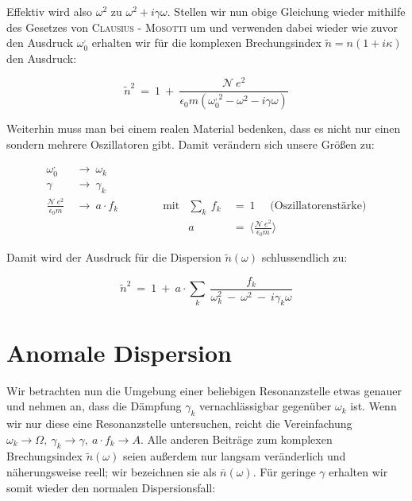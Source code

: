 Effektiv wird  also $\omega^2$ zu $\omega^2 + i\gamma\omega$. Stellen wir nun obige Gleichung wieder mithilfe des Gesetzes von \textsc{Clausius - Mosotti} um und verwenden dabei wieder wie zuvor den Ausdruck $\omega^{,}_0$ erhalten wir für die komplexen Brechungsindex $\tilde{n}= n (1+i\kappa)$ den Ausdruck:

\begin{equation*}
\tilde{n}^2 \ = \ 1 \ + \ \frac{\mathcal{N} \ e^2}{\epsilon_0 m \left(\omega^{,2}_0 - \omega^2 - i \gamma\omega\right)}
\end{equation*}

Weiterhin muss man bei einem realen Material bedenken, dass es nicht nur einen sondern mehrere Oszillatoren gibt. Damit verändern sich unsere Größen zu:

\begin{align*}
\omega^{,}_0 \ &\rightarrow \ \omega_k\\
\gamma \ &\rightarrow \ \gamma_k\\
\frac{\mathcal{N} \ e^2}{\epsilon_0 m} \ &\rightarrow \ a \cdot f_k \qquad\qquad \text{mit}  &\sum_k \ f_k  \ &= \ 1 \quad \text{  (Oszillatorenstärke)}\\
& &a \ &= \ \Bigg\langle\frac{\mathcal{N}\ e^2}{\epsilon_0 m}\Bigg\rangle
\end{align*}

Damit wird der Ausdruck für die Dispersion $\tilde{n}(\omega)$ schlussendlich zu:

\begin{equation*}
\tilde{n}^2 \ = \ 1 \ + \ a \cdot\sum_k \ \frac{f_k}{\omega_k^2 \ - \ \omega^2 \ - \ i\gamma_k\omega}
\end{equation*}

\section{Anomale Dispersion}

Wir betrachten nun die Umgebung einer beliebigen Resonanzstelle etwas genauer und nehmen an, dass die Dämpfung $\gamma_k$ vernachlässigbar gegenüber $\omega_k$ ist. Wenn wir nur diese eine Resonanzstelle untersuchen, reicht die Vereinfachung $\omega_k \rightarrow \Omega, \ \gamma_k \rightarrow\gamma, \ a \cdot f_k \rightarrow A$. Alle anderen Beiträge zum komplexen Brechungsindex $\tilde{n}(\omega)$ seien außerdem nur  langsam veränderlich und näherungsweise reell; wir bezeichnen sie als $\overline{n}(\omega)$. Für geringe $\gamma$ erhalten wir somit wieder den normalen Dispersionsfall:

